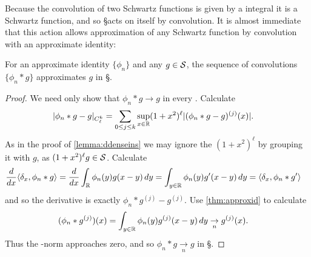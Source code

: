     Because the convolution of two Schwartz functions is given by a \gp integral it is a Schwartz function, and so \S acts on itself by convolution.
    It is almost immediate that this action allows approximation of any Schwartz function by convolution with an approximate identity:
    \begin{lemma}
      \label{lemma:approxbyconv}
      For an approximate identity $\{\phi_n\}$ and any $g\in\S$, the sequence of convolutions $\{\phi_n*g\}$ approximates $g$ in \S.
    \end{lemma}
    \begin{proof}
      We need only show that $\phi_n*g\rightarrow g$ in every \Ckl.
      Calculate
      \begin{align*}
        |\phi_n*g - g|_\Ckl
        &= \sum_{0\le j\le k} \sup_{x\in\R} (1+x^2)^\ell |(\phi_n*g - g)^{(j)}(x)| \text{.}
      \end{align*}
      As in the proof of \cref{lemma:ddenseins} we may ignore the $(1+x^2)^\ell$ by grouping it with $g$, as $(1+x^2)^\ell g\in\S$.
      Calculate
      \begin{align*}
        \frac{d}{dx} \langle \delta_x, \phi_n*g\rangle
        &= \frac{d}{dx}\int_{\R} \phi_n(y)g(x-y)\,dy
        = \int_{y\in\R} \phi_n(y)g'(x-y)\,dy
        = \langle \delta_x, \phi_n*g'\rangle
      \end{align*}
      and so the derivative is exactly $\phi_n*g^{(j)}-g^{(j)}$.
      Use \cref{thm:approxid} to calculate
      \begin{align*}
        (\phi_n*g^{(j)})(x)
        &= \int_{y\in\R} \phi_n(y)g^{(j)}(x-y)\,dy
        \underset{n}{\rightarrow} g^{(j)}(x) \text{.}
      \end{align*}
      Thus the \Ckl-norm approaches zero, and so $\phi_n*g\underset{n}{\rightarrow}g$ in \S.
    \end{proof}


